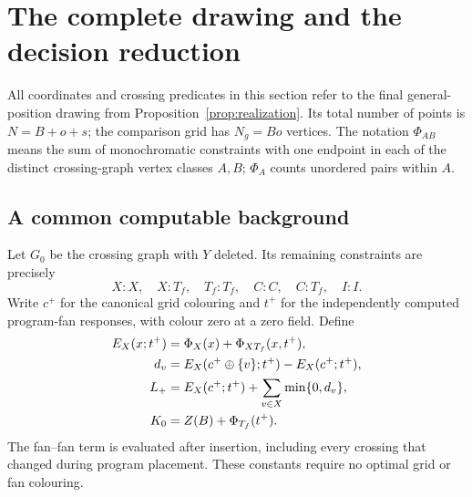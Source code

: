 \section{The complete drawing and the decision reduction}\label{sec:reduction}

All coordinates and crossing predicates in this section refer to the final general-position drawing from Proposition~\ref{prop:realization}. Its total number of points is $N=B+o+s$; the comparison grid has $N_g=Bo$ vertices. The notation $\Phi_{AB}$ means the sum of monochromatic constraints with one endpoint in each of the distinct crossing-graph vertex classes $A,B$; $\Phi_A$ counts unordered pairs within $A$.

\subsection{A common computable background}
Let $G_0$ be the crossing graph with $Y$ deleted. Its remaining constraints are precisely
\[
X\!:\!X,\quad X\!:\!T_f,\quad T_f\!:\!T_f,\quad C\!:\!C,\quad C\!:\!T_f,\quad I\!:\!I.
\]
Write $c^+$ for the canonical grid colouring and $t^+$ for the independently computed program-fan responses, with colour zero at a zero field. Define
\begin{align}
E_X(x;t^+)&=\Phi_X(x)+\Phi_{XT_f}(x,t^+),\notag\\
d_v&=E_X(c^+\oplus\{v\};t^+)-E_X(c^+;t^+),\notag\\
L_+&=E_X(c^+;t^+)+\sum_{v\in X}\min\{0,d_v\},\notag\\
K_0&=Z(B)+\Phi_{T_f}(t^+).
\label{eq:background}
\end{align}
The fan--fan term is evaluated after insertion, including every crossing that changed during program placement. These constants require no optimal grid or fan colouring.

